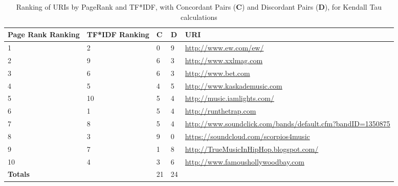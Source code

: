 \newpage
\begin{table}
\small
\begin{tabular}{ | p{1.0cm} | p{1.0cm} | p{0.85cm} | p{0.85cm} | p{8.0cm} | }
\hline
\textbf{Page Rank Ranking} & \textbf{TF*IDF Ranking} & \textbf{C} & \textbf{D} & \textbf{URI} \\
\hline
1 & 2 & 0 & 9 & \url{http://www.ew.com/ew/} \\
\hline
2 & 9 & 6 & 3 & \url{ http://www.xxlmag.com} \\
\hline
3 & 6 & 6 & 3 & \url{ http://www.bet.com} \\
\hline
4 & 5 & 4 & 5 & \url{ http://www.kaskademusic.com} \\
\hline 
5 & 10 & 5 & 4 & \url{ http://music.iamlights.com/} \\
\hline
6 & 1 & 5& 4 & \url{http://runthetrap.com} \\
\hline
7 & 8 & 5 & 4 & \url{ http://www.soundclick.com/bands/default.cfm?bandID=1350875} \\
\hline
8 & 3 & 9 & 0 & \url{ https://soundcloud.com/scorpios4music} \\
\hline
9 & 7 & 1 & 8 & \url{ http://TrueMusicInHipHop.blogspot.com/} \\
\hline
10 & 4 & 3 & 6 &\url{ http://www.famoushollywoodbay.com} \\
\hline
\hline
\textbf{Totals} & \cellcolor[gray]{0} & 21 & 24 & \cellcolor[gray]{0} \\
\hline
\end{tabular}
\caption{Ranking of URIs by PageRank and TF*IDF, with Concordant Pairs (\textbf{C}) and Discordant Pairs (\textbf{D}), for Kendall Tau calculations}
\label{table:q4-1}
\end{table}
